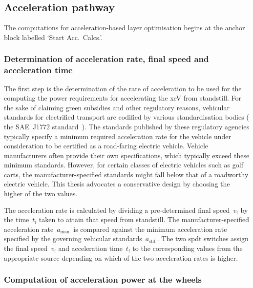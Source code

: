 \subsection{Acceleration pathway}\label{sec:accpathway}

The computations for acceleration-based layer  optimisation begins at the anchor
block labelled `Start Acc.\ Calcs.'.

\subsubsection*{Determination of acceleration rate, final speed and acceleration time}

The first step is  the determination of the rate of acceleration  to be used for
the  computing  the  power  requirements for  accelerating  the  \gls{xeV}  from
standstill.  For the  sake  of  claiming green  subsidies  and other  regulatory
reasons,  vehicular   standards  for  electrified  transport   are  codified  by
various  standardisation bodies  (\eg{} the  SAE~J1772 standard~\cite{Sae2010}).
The  standards  published  by  these regulatory  agencies  typically  specify  a
minimum required  acceleration rate  for the vehicle  under consideration  to be
certified as a road-faring electric vehicle. Vehicle manufacturers often provide
their  own  specifications,  which  typically exceed  these  minimum  standards.
However,  for certain  classes  of electric  vehicles such  as  golf carts,  the
manufacturer-specified standards might fall below  that of a roadworthy electric
vehicle. This thesis  advocates a conservative design by choosing  the higher of
the two values.

The  acceleration  rate  is  calculated   by  dividing  a  pre-determined  final
speed~$v_\text{f}$  by the  time~$t_\text{f}$ taken  to attain  that speed  from
standstill.  The  manufacturer-specified  acceleration  rate~$a_\text{man.}$  is
compared  against  the minimum  acceleration  rate  specified by  the  governing
vehicular  standards~$a_\text{std.}$. The  two  \gls{spdt}  switches assign  the
final speed~$v_\text{f}$ and acceleration time~$t_\text{f}$ to the corresponding
values from  the appropriate source depending  on which of the  two acceleration
rates is higher.

\subsubsection*{Computation of acceleration power at the wheels}

